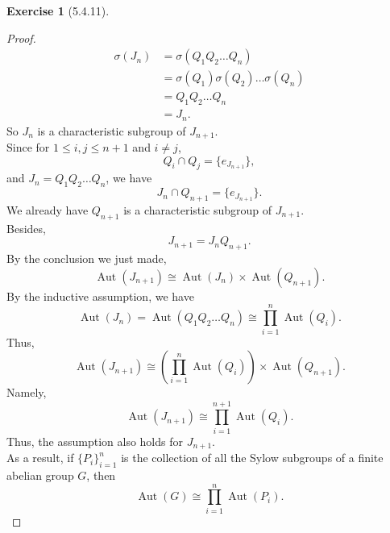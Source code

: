 \documentclass{amsart}
\theoremstyle{plain}
\theoremstyle{definition}
\newtheorem{exer}[lem]{Exercise}
\begin{document}
\begin{exer}[5.4.11]
\begin{proof}
\begin{align*}
	 	\sigma(J_n) &= \sigma(Q_1Q_2\ldots Q_n)\\
	  				&= \sigma(Q_1)\sigma(Q_2)\ldots \sigma(Q_n) \\
	  				&=Q_1 Q_2\dots Q_n \\
	  			   &=J_n.
	\end{align*}
	So $J_n$ is a characteristic subgroup of $J_{n+1}$.\\
 	Since for $1 \leq i,j \leq n+1$ and $i\neq j$,
 		\[Q_i \cap Q_j = \{e_{J_{n+1}}\},\]
 	and $J_n =Q_1Q_2\ldots Q_n$, we have 
 	\[J_n \cap Q_{n+1} = \{e_{J_{n+1}}\}.\]
	We already have $Q_{n+1}$ is a characteristic subgroup of $J_{n+1}$.\\
	Besides,
	\[J_{n+1} = J_nQ_{n+1}.\]
	By the conclusion we just made,
	\[\operatorname{Aut}(J_{n+1}) \cong \operatorname{Aut}(J_n) \times \operatorname{Aut}(Q_{n+1}).\]
	By the inductive assumption, we have
	\[\operatorname{Aut}(J_n)  = \operatorname{Aut}(Q_1Q_2\ldots Q_n) \cong \prod_{i=1}^{n} \operatorname{Aut}(Q_i).\]
	Thus,
  	\[\operatorname{Aut}(J_{n+1}) \cong \left(\prod_{i=1}^{n} \operatorname{Aut}(Q_i) \right)\times \operatorname{Aut}(Q_{n+1}).\]
	Namely,
	\[\operatorname{Aut}(J_{n+1}) \cong \prod_{i=1}^{n+1} \operatorname{Aut}(Q_i).\]
	Thus, the assumption also holds for $J_{n+1}$.\\
	As a result, if $\{P_i\}_{i=1}^n$ is the collection of all the Sylow subgroups of a finite abelian group $G$, then
	\[\operatorname{Aut}(G) \cong \prod_{i=1}^{n} \operatorname{Aut}(P_i).\]
\end{proof}

\begin{align*}
\end{align*}

\end{exer}
\end{document}
